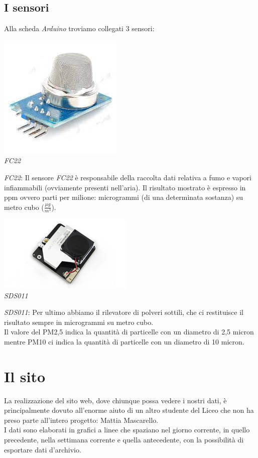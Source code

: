 \documentclass{article}
\begin{document}
\subsection{I sensori}
Alla scheda \emph{Arduino} troviamo collegati 3 sensori:
\begin{center}
\includegraphics[]{images/FC22.png}\\
\caption{\emph{FC22}}
\end{center}
\emph{FC22}: Il sensore \emph{FC22} è responsabile della raccolta dati relativa a fumo e vapori infiammabili (ovviamente presenti nell’aria). Il risultato mostrato è espresso in ppm ovvero parti per milione: microgrammi (di una determinata sostanza) su metro cubo ($\frac{\mu g}{m^3}$).
\begin{center}
\includegraphics[]{images/sds011.jpg}\\
\caption{\emph{SDS011}}
\end{center}
\emph{SDS011}: Per ultimo abbiamo il rilevatore di polveri sottili, che ci restituisce il risultato sempre in microgrammi su metro cubo.\\
Il valore del PM2,5 indica la quantità di particelle con un diametro di 2,5 micron mentre PM10 ci indica la quantità di particelle con un diametro di 10 micron.
\section{Il sito}
La realizzazione del sito web, dove chiunque possa vedere i nostri dati, è principalmente dovuto all’enorme aiuto di un altro studente del Liceo che non ha preso parte all’intero progetto: Mattia Mascarello.\\
I dati sono elaborati in grafici a linee che spaziano nel giorno corrente, in quello precedente, nella settimana corrente e quella antecedente, con la possibilità di esportare dati d'archivio.\\
\end{document}
